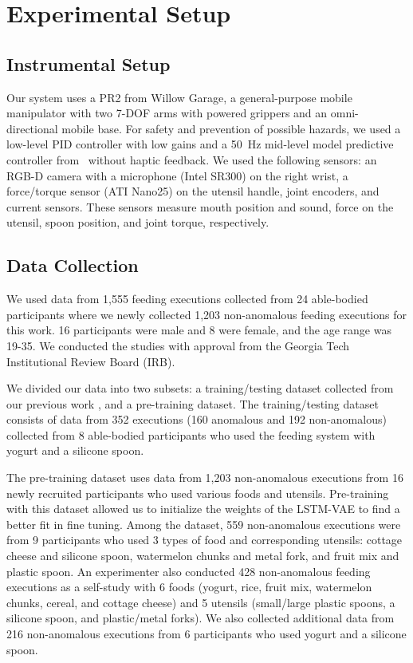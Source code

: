 \documentclass[letterpaper, 10 pt, conference]{ieeeconf}
\begin{document}
\section{Experimental Setup}

\subsection{Instrumental Setup}
Our system uses a PR2 from Willow Garage, a general-purpose mobile manipulator with two 7-DOF arms with powered grippers and an omni-directional mobile base. For safety and prevention of possible hazards, we used a low-level PID controller with low gains and a \SI{50}{\hertz} mid-level model predictive controller from~\cite{jain2013reaching} without haptic feedback. We used the following sensors: an RGB-D camera with a microphone (Intel SR300) on the right wrist, a force/torque sensor (ATI Nano25) on the utensil handle, joint encoders, and current sensors. These sensors measure mouth position and sound, force on the utensil, spoon position, and joint torque, respectively. 

\subsection{Data Collection}
We used data from 1,555 feeding executions collected from 24 able-bodied participants where we newly collected 1,203 non-anomalous feeding executions for this work. 16 participants were male and 8 were female, and the age range was 19-35. We conducted the studies with approval from the Georgia Tech Institutional Review Board (IRB).

We divided our data into two subsets: a training/testing dataset collected from our previous work \cite{park2017class}, and a pre-training dataset. The training/testing dataset consists of data from 352 executions (160 anomalous and 192 non-anomalous) collected from 8 able-bodied participants who used the feeding system with yogurt and a silicone spoon. 

The pre-training dataset uses data from 1,203 non-anomalous executions from 16 newly recruited participants who used various foods and utensils. Pre-training with this dataset allowed us to initialize the weights of the LSTM-VAE to find a better fit in fine tuning. Among the dataset, 559 non-anomalous executions were from 9 participants who used 3 types of food and corresponding utensils: cottage cheese and silicone spoon, watermelon chunks and metal fork, and fruit mix and plastic spoon. An experimenter also conducted 428 non-anomalous feeding executions as a self-study with 6 foods (yogurt, rice, fruit mix, watermelon chunks, cereal, and cottage cheese) and 5 utensils (small/large plastic spoons, a silicone spoon, and plastic/metal forks). We also collected additional data from 216 non-anomalous executions from 6 participants who used yogurt and a silicone spoon.
\end{document}

